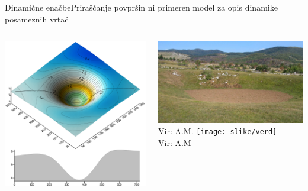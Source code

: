 \documentclass{beamer}
\begin{document}
\begin{frame}{Dinamične enačbe}{Priraščanje povpršin ni primeren model za opis dinamike posameznih vrtač}
\begin{columns}
  \begin{column}{0.7\textwidth}
    \hspace*{-0.09\textwidth}\includegraphics[width=\textwidth]{slike/menisija-vrtaca}
  \end{column}
  \begin{column}{0.3\textwidth}
    \hspace*{-0.3\textwidth}\includegraphics[width=1.4\textwidth]{slike/vrtaca}
    \tiny{\\ Vir: A.M.} \newline \newline
    \hspace*{-0.3\textwidth}\texttt{[image: slike/verd]}
    \tiny{\\ Vir: A.M}
  \end{column}
\end{columns}

\end{frame}
\end{document}
